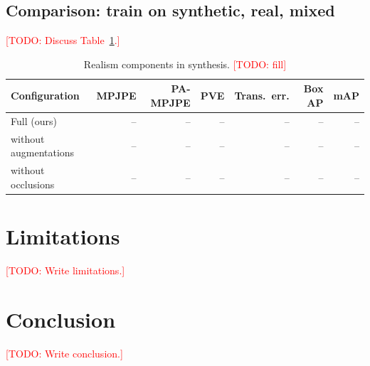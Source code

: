 \documentclass{egpubl}
\newcommand{\todo}[1]{\textcolor{red}{[TODO: #1]}}
\begin{document}
\subsection{Comparison: train on synthetic, real, mixed}
\todo{Discuss Table~\ref{tab:abl_realism}.}

\begin{table}[t]
  \centering
  \caption{Realism components in synthesis. \todo{fill}}
  \label{tab:abl_realism}
  \begin{tabular}{@{}lrrrrrr@{}}
    \toprule
    Configuration & MPJPE & PA-MPJPE & PVE & Trans.\ err. & Box AP & mAP \\
    \midrule
    Full (ours)                        & -- & -- & -- & -- & -- & -- \\
    without augmentations              & -- & -- & -- & -- & -- & -- \\
    without occlusions                 & -- & -- & -- & -- & -- & -- \\
    \bottomrule
  \end{tabular}
\end{table}

\section{Limitations}
\label{sec:limitations}
\todo{Write limitations.}

\section{Conclusion}
\label{sec:conclusion}
\todo{Write conclusion.}



\end{document}
